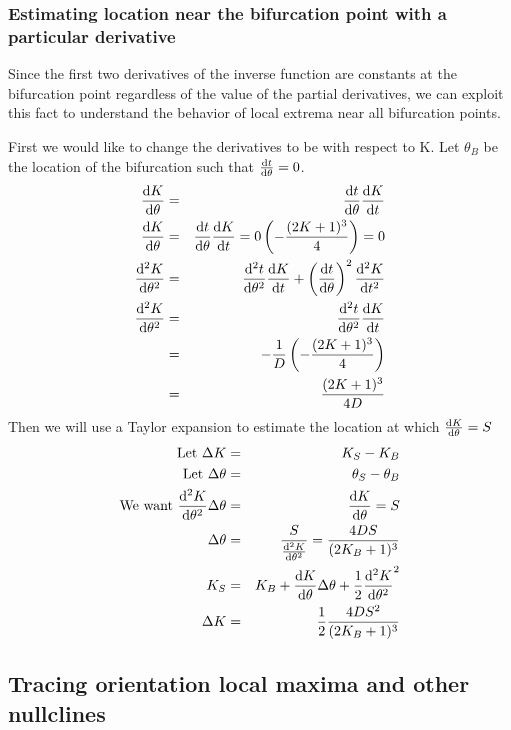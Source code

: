 \documentclass[11pt]{article} %
\begin{document}
\subsubsection{Estimating location near the bifurcation point with a particular derivative}
Since the first two derivatives of the inverse function are constants at the bifurcation point regardless of the value of the partial derivatives, we can exploit this fact to understand the behavior of local extrema near all bifurcation points.

First we would like to change the derivatives to be with respect to K. Let $ \theta_B $ be the location of the bifurcation such that $ \dv{t}{\theta} (\theta_B) = 0 $.
\begin{eqnarray}
\dv{K}{\theta} & = & \dv{t}{\theta} \dv{K}{t} \\
\dv{K}{\theta} (\theta_B) & = & \dv{t}{\theta} (\theta_B) \dv{K}{t} = 0 \left( -\frac{(2K+1)^3}{4} \right) = 0 \\
\dv[2]{K}{\theta} & = & \dv[2]{t}{\theta} \dv{K}{t} + \left( \dv{t}{\theta} \right)^2 \dv[2]{K}{t}  \\
\dv[2]{K}{\theta} (\theta_B) & = & \dv[2]{t}{\theta} (\theta_B) \dv{K}{t} \\
    & = & -\frac{1}{D} \left( -\frac{(2K+1)^3}{4} \right) \\
    & = & \frac{(2K+1)^3}{4D} \\
\end{eqnarray}
Then we will use a Taylor expansion to estimate the location at which $ \dv{K}{\theta} = S $
\begin{eqnarray}
\mbox{Let } \Delta K & = & K_S - K_B \\
\mbox{Let } \Delta \theta & = & \theta_S - \theta_B \\
\mbox{We want } \dv[2]{K}{\theta}  \Delta \theta & = & \dv{K}{\theta} = S \\
\Delta \theta & = & \frac{S}{\dv[2]{K}{\theta} } = \frac{4DS}{(2K_B+1)^3}\\
K_S & = & K_B  +\dv{K}{\theta} \Delta \theta + \frac{1}{2} \dv[2]{K}{\theta} (\Delta \theta)^2 \\
\Delta K & = & \frac{1}{2}  \frac{4DS^2}{(2K_B+1)^3}
\end{eqnarray}


\subsection{Tracing orientation local maxima and other nullclines}
\end{document}
